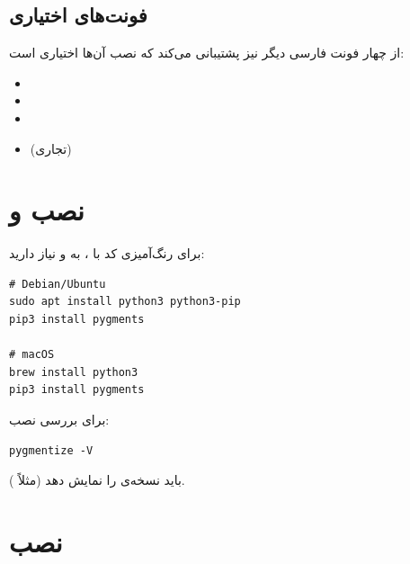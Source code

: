 
\subsection{فونت‌های اختیاری}
\label{sec:installation-font-optional}

 از چهار فونت فارسی دیگر نیز
پشتیبانی می‌کند که نصب آن‌ها اختیاری است:

\begin{itemize}
    \item {}
    \item {}
    \item {}
    \item {} (تجاری)
\end{itemize}

\section{نصب  و }
\label{sec:installation-python}

برای رنگ‌آمیزی کد با ، به 
و  نیاز دارید:

\begin{latin}
\begin{verbatim}
# Debian/Ubuntu
sudo apt install python3 python3-pip
pip3 install pygments

# macOS
brew install python3
pip3 install pygments
\end{verbatim}
\end{latin}

برای بررسی نصب:

\begin{latin}
\begin{verbatim}
pygmentize -V
\end{verbatim}
\end{latin}

باید نسخه‌ی  را نمایش دهد (مثلاً
).


\section{نصب }
\label{sec:installation-matinbook}

